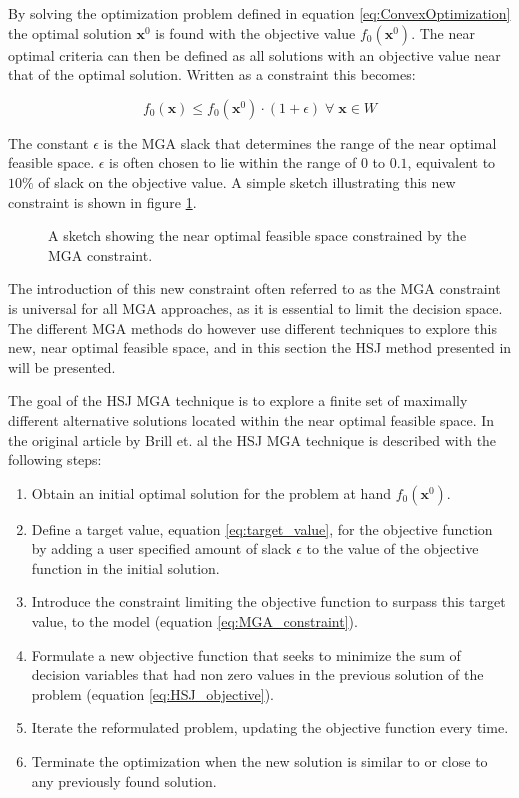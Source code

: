 By solving the optimization problem defined in equation \ref{eq:ConvexOptimization} the optimal solution $\mathbf{x}^0 $ is found  with the objective value $ f_0(\mathbf{x}^0 ) $. The near optimal criteria can then be defined as all solutions with an objective value near that of the optimal solution. Written as a constraint this becomes: 

\begin{equation}\label{eq:MGA_constraint1}
 f_0(\mathbf{x}) \leq f_0(\mathbf{x}^0)  \cdot (1+\epsilon) \; \forall \;  \mathbf{x}\in W
\end{equation}

The constant $ \epsilon $ is the MGA slack that determines the range of the near optimal feasible space. $ \epsilon $ is often chosen to lie within the range of $0$ to $0.1$, equivalent to $10\%$ of slack on the objective value. A simple sketch illustrating this new constraint is shown in figure \ref{fig:sketch_feasable_space}.

\begin{figure}[h]
	\caption{A sketch showing the near optimal feasible space constrained by the MGA constraint.}
	\label{fig:sketch_feasable_space}	
\end{figure}

The introduction of this new constraint often referred to as the MGA constraint is universal for all MGA approaches, as it is essential to limit the decision space. The different MGA methods do however use different techniques to explore this new, near optimal feasible space, and in this section the HSJ method presented in \cite{Brill_MGA_1982} will be presented.  

The goal of the HSJ MGA technique is to explore a finite set of maximally different alternative solutions located within the near optimal feasible space. In the original article by Brill et. al \cite{Brill_MGA_1982} the HSJ MGA technique is described with the following steps:

\begin{enumerate}
	\item Obtain an initial optimal solution for the problem at hand $f_0(\mathbf{x}^0)$. 
	\item Define a target value, equation \ref{eq:target_value}, for the objective function by adding a user specified amount of slack  $ \epsilon $ to the value of the objective function in the initial solution. 
	\item Introduce the constraint limiting the objective function to surpass this target value, to the model (equation \ref{eq:MGA_constraint}).
	\item Formulate a new objective function that seeks to minimize the sum of decision variables that had non zero values in the previous solution of the problem (equation \ref{eq:HSJ_objective}). 
	\item Iterate the reformulated problem, updating the objective function every time. 
	\item Terminate the optimization when the new solution is similar to or close to any previously found solution. 
\end{enumerate}


